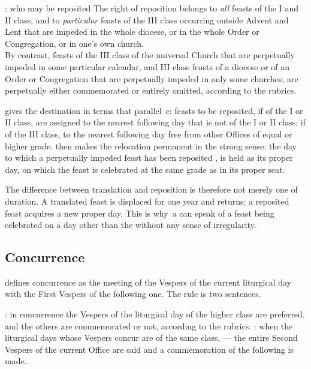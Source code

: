 \begin{studybox}{: who may be reposited}
The right of reposition belongs to \emph{all} feasts of the I and II class, and to
\emph{particular} feasts of the III class occurring outside Advent and Lent that are impeded in
the whole diocese, or in the whole Order or Congregation, or in one's own church.\\[0.4em]
By contrast, feasts of the III class of the universal Church that are perpetually impeded in
some particular calendar, and III class feasts of a diocese or of an Order or Congregation that
are perpetually impeded in only some churches, are perpetually either commemorated or entirely
omitted, according to the rubrics.
\end{studybox}

 gives the destination in terms that parallel \,c: feasts to be reposited, if of
the I or II class, are assigned to the nearest following day that is not of the I or II class;
if of the III class, to the nearest following day free from other Offices of equal or higher
grade.  then makes the relocation permanent in the strong sense: the day to which a
perpetually impeded feast has been reposited , is held as
its proper day, on which the feast is celebrated at the same grade as in its proper seat.

The difference between translation and reposition is therefore not merely one of duration.
A translated feast is displaced for one year and returns; a reposited feast acquires a new
proper day. This is why \,a can speak of a feast being celebrated on a day other than the
 without any sense of irregularity.

\subsection{Concurrence}

 defines concurrence as the meeting of the Vespers of the current liturgical day with
the First Vespers of the following one. The rule is two sentences.

: in concurrence the Vespers of the liturgical day of the higher class are preferred,
and the others are commemorated or not, according to the rubrics. : when the liturgical
days whose Vespers concur are of the same class,  — the entire Second Vespers of the current
Office are said and a commemoration of the following is made.

